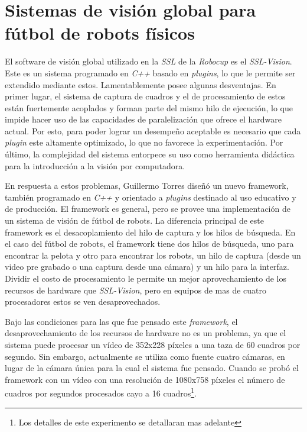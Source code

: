 
\section{Sistemas de visión global para fútbol de robots físicos}


El software de visión global utilizado en la \emph{SSL} de la \emph{Robocup} es
el \emph{SSL-Vision}\cite{sslvision}. Este es un sistema programado en
\emph{C++} basado en \emph{plugins}, lo que le permite ser extendido mediante
estos. Lamentablemente posee algunas desventajas. En primer lugar, el sistema de
captura de cuadros y el de procesamiento de estos están fuertemente acoplados y
forman parte del mismo hilo de ejecución, lo que impide hacer uso de las
capacidades de paralelización que ofrece el hardware actual. Por esto, para
poder lograr un desempeño aceptable es necesario que cada \emph{plugin} este
altamente optimizado, lo que no favorece la experimentación. Por último, la
complejidad del sistema entorpece su uso como herramienta didáctica para la
introducción a la visión por computadora.

En respuesta a estos problemas, Guillermo Torres\cite{torres2014} diseñó un
nuevo framework, también programado en \emph{C++} y orientado a \emph{plugins}
destinado al uso educativo y de producción. El framework es general, pero se
provee una implementación de un sistema de visión de fútbol de robots. La
diferencia principal de este framework es el desacoplamiento del hilo de captura
y los hilos de búsqueda. En el caso del fútbol de robots, el framework tiene dos
hilos de búsqueda, uno para encontrar la pelota y otro para encontrar los
robots, un hilo de captura (desde un video pre grabado o una captura desde una
cámara) y un hilo para la interfaz. Dividir el costo de procesamiento le permite
un mejor aprovechamiento de los recursos de hardware que \emph{SSL-Vision}, pero
en equipos de mas de cuatro procesadores estos se ven desaprovechados.

Bajo las condiciones para las que fue pensado este \emph{framework}, el
desaprovechamiento de los recursos de hardware no es un problema, ya que el
sistema puede procesar un vídeo de 352x228 píxeles a una taza de 60 cuadros por
segundo. Sin embargo, actualmente se utiliza como fuente cuatro cámaras, en
lugar de la cámara única para la cual el sistema fue pensado. Cuando se probó el
framework con un vídeo con una resolución de 1080x758 píxeles el número de
cuadros por segundos procesados cayo a 16 cuadros\footnote{Los detalles de este
experimento se detallaran mas adelante}.
